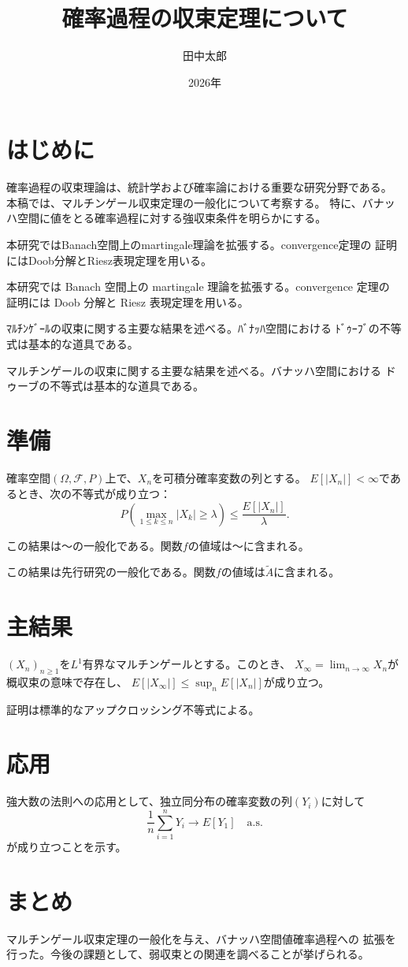 \documentclass{article}
\title{確率過程の収束定理について}
\author{田中太郎}
\date{2026年}
\begin{document}
\maketitle

\section{はじめに}

確率過程の収束理論は、統計学および確率論における重要な研究分野である。
本稿では、マルチンゲール収束定理の一般化について考察する。
特に、バナッハ空間に値をとる確率過程に対する強収束条件を明らかにする。

本研究ではBanach空間上のmartingale理論を拡張する。convergence定理の
証明にはDoob分解とRiesz表現定理を用いる。

本研究では Banach 空間上の martingale 理論を拡張する。convergence 定理の
証明には Doob 分解と Riesz 表現定理を用いる。

ﾏﾙﾁﾝｹﾞｰﾙの収束に関する主要な結果を述べる。ﾊﾞﾅｯﾊ空間における
ﾄﾞｩｰﾌﾞの不等式は基本的な道具である。

マルチンゲールの収束に関する主要な結果を述べる。バナッハ空間における
ドゥーブの不等式は基本的な道具である。

\section{準備}

確率空間$(\Omega, \mathcal{F}, P)$上で、$X_n$を可積分確率変数の列とする。
$E[|X_n|] < \infty$であるとき、次の不等式が成り立つ：
\[
  P\left(\max_{1 \le k \le n} |X_k| \ge \lambda\right) \le \frac{E[|X_n|]}{\lambda}.
\]

この結果は～の一般化である。関数$f$の値域は～に含まれる。

この結果は先行研究の一般化である。関数$f$の値域は$\tilde{A}$に含まれる。

\section{主結果}

\begin{theorem}
$(X_n)_{n \ge 1}$を$L^1$有界なマルチンゲールとする。このとき、
$X_\infty = \lim_{n \to \infty} X_n$が概収束の意味で存在し、
$E[|X_\infty|] \le \sup_n E[|X_n|]$が成り立つ。
\end{theorem}

証明は標準的なアップクロッシング不等式による。

\section{応用}

強大数の法則への応用として、独立同分布の確率変数の列$(Y_i)$に対して
\[
  \frac{1}{n}\sum_{i=1}^{n} Y_i \to E[Y_1] \quad \text{a.s.}
\]
が成り立つことを示す。

\section{まとめ}

マルチンゲール収束定理の一般化を与え、バナッハ空間値確率過程への
拡張を行った。今後の課題として、弱収束との関連を調べることが挙げられる。
\end{document}
